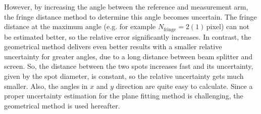 \documentclass{article}
\begin{document}
However, by increasing the angle between the reference and measurement arm, the fringe distance method to determine this angle becomes uncertain. The fringe distance at the maximum angle (e.g. for example $N_\text{fringe}=2(1)\,$pixel) can not be estimated better, so the relative error significantly increases. In contrast, the geometrical method delivers even better results with a smaller relative uncertainty for greater angles, due to a long distance between beam splitter and screen. So, the distance between the two spots increases fast and its uncertainty, given by the spot diameter, is constant, so the relative uncertainty gets much smaller. Also, the angles in $x$ and $y$ direction are quite easy to calculate. Since a proper uncertainty estimation for the plane fitting method is challenging, the geometrical method is used hereafter.

\end{document}

